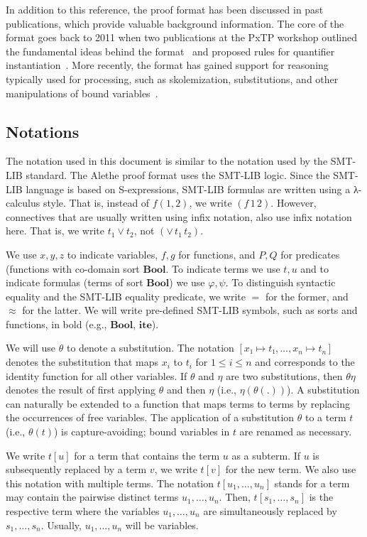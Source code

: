 \documentclass{scrartcl}
\newcommand\lsymb[1]{\mathbf{#1}}
\theoremstyle{definition}
\begin{document}
In addition to this reference, the proof format has been discussed in past
publications, which provide valuable background information.  The core of
the format goes back to 2011 when two publications at the PxTP workshop
outlined the fundamental ideas behind the format~\cite{besson-2011}
and proposed rules for quantifier instantiation~\cite{deharbe-2011}.
%
More recently, the format has gained support for reasoning typically used for
processing, such as skolemization, substitutions, and other manipulations of
bound variables~\cite{barbosa-2019}.

\subsection{Notations}

The notation used in this document is similar to the notation
used by the SMT-LIB standard.  The Alethe proof format uses
the SMT-LIB logic.  Since the SMT-LIB language is based on
S-expressions, SMT-LIB formulas are written using
a λ-calculus style.  That is, instead of $f(1,2)$, we write $(f\,1\,2)$.
However, connectives that are usually written using infix notation, also
use infix notation here.  That is, we write $t_1 \lor t_2$, not
$(\lor\,t_1\,t_2)$.

We use $x, y, z$ to indicate variables,
$f, g$ for functions, and $P, Q$ for predicates (functions with co-domain
sort $\lsymb{Bool}$.  To indicate terms we use $t, u$ and to indicate
formulas (terms of sort $\lsymb{Bool}$) we use $\varphi, \psi$.
To distinguish syntactic equality and the SMT-LIB equality predicate,
we write $=$ for the former, and $≈$ for the latter.
We will write pre-defined SMT-LIB symbols, such as sorts and functions,
in bold (e.g., $\lsymb{Bool}$, $\lsymb{ite}$).

We will use $θ$ to denote a substitution.
The notation $[x₁ ↦ t₁, …, x_n ↦ t_n]$ denotes the substitution
that maps $x_i$ to $t_i$ for $1 ≤ i ≤ n$ and corresponds to the
identity function for all other variables.
%
If $θ$ and $η$ are two
substitutions, then $θη$ denotes the result of first applying $θ$
and then $η$ (i.e., $η(θ(.))$).  A substitution can naturally be extended
to a function that maps terms to terms by replacing the occurrences of
free variables.
%
The application of a substitution $θ$ to a term $t$ (i.e., $θ(t)$)
is capture-avoiding; bound variables in $t$ are renamed as necessary.

We write $t[u]$ for a term that contains the term $u$ as a subterm.  If $u$
is subsequently replaced by a term $v$, we write $t[v]$ for the
new term.
%
We also use this notation with multiple terms.
%
The notation $t[u_1, \dots, u_n]$ stands for a term may contain the
pairwise distinct terms $u_1, \dots, u_n$.
%
Then, $t[s_1,\dots, s_n]$ is the respective term where the
variables $u_1,\dots, u_n$ are
simultaneously replaced by $s_1,\dots, s_n$.  Usually, $u_1, \dots, u_n$ will
be variables.
\end{document}
